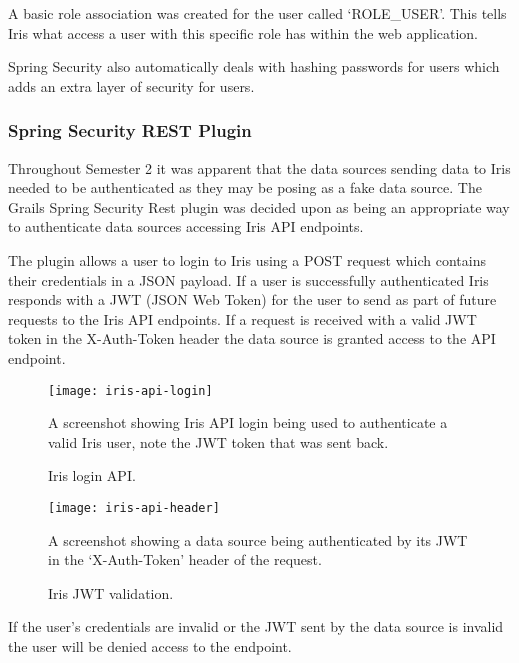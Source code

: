 \documentclass[12pt,a4paper,titlepage]{report}
\begin{document}
A basic role association was created for the user called `ROLE\_USER'. This tells Iris what access a user with this specific role has within the web application.

Spring Security also automatically deals with hashing passwords for users which adds an extra layer of security for users.
\subsubsection{Spring Security REST Plugin}
Throughout Semester 2 it was apparent that the data sources sending data to Iris needed to be authenticated as they may be posing as a fake data source. The Grails Spring Security Rest plugin was decided upon as being an appropriate way to authenticate data sources accessing Iris API endpoints.

The plugin allows a user to login to Iris using a POST request which contains their credentials in a JSON payload. If a user is successfully authenticated Iris responds with a JWT (JSON Web Token) for the user to send as part of future requests to the Iris API endpoints. If a request is received with a valid JWT token in the X-Auth-Token header the data source is granted access to the API endpoint.


\begin{figure}[H]
\begin{tcolorbox}
\begin{center}
\texttt{[image: iris-api-login]}
\end{center}
A screenshot showing Iris API login being used to authenticate a valid Iris user, note the JWT token that was sent back.
\end{tcolorbox}
\caption{Iris login API.}
\end{figure}

\begin{figure}[H]
\begin{tcolorbox}
\begin{center}
\texttt{[image: iris-api-header]}
\end{center}
A screenshot showing a data source being authenticated by its JWT in the `X-Auth-Token' header of the request.
\end{tcolorbox}
\caption{Iris JWT validation.}
\end{figure}

If the user's credentials are invalid or the JWT sent by the data source is invalid the user will be denied access to the endpoint.
\end{document}
